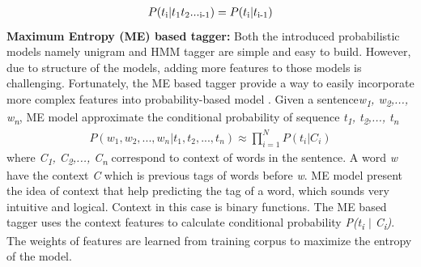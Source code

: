 \begin{eqnarray*}
P(t\textsubscript{i} \vert t\textsubscript{1}t\textsubscript{2}...\textsubscript{i-1}) = P(t\textsubscript{i} \vert t\textsubscript{i-1})
\end{eqnarray*}
\textbf{Maximum Entropy (ME) based tagger:} Both the introduced probabilistic models namely unigram and HMM tagger are simple and easy to build. However, due to structure of the models, adding more features to those models is challenging. Fortunately, the ME based tagger provide a way to easily incorporate more complex features into probability-based model \cite{Ratnaparkhi1996}. Given a sentence\textit{w\textsubscript{1}, w\textsubscript{2},..., w\textsubscript{n}}, ME model approximate the conditional probability of sequence \textit{t\textsubscript{1}, t\textsubscript{2},..., t\textsubscript{n}}
\begin{eqnarray*}
P(w_{1}, w_{2},..., w_{n} \vert t_{1}, t_{2},..., t_{n}) \approx \prod_{i=1}^{N} P(t_{i} \vert C_{i})
\end{eqnarray*}
where \textit{C\textsubscript{1}, C\textsubscript{2},..., C\textsubscript{n}} correspond to context of words in the sentence. A word \textit{w} have the context \textit{C} which is previous tags of words before \textit{w}. ME model present the idea of context that help predicting the tag of a word, which sounds very intuitive and logical. Context in this case is binary functions. The ME based tagger uses the context features to calculate conditional probability \textit{P(t\textsubscript{i} $\vert$ C\textsubscript{i})}. The weights of features are learned from training corpus to maximize the entropy of the model. 



